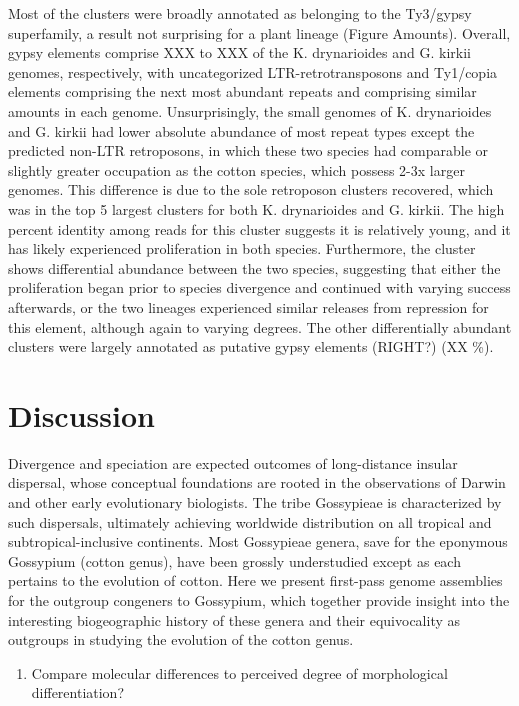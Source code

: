 \documentclass[10pt,letterpaper]{article}
\begin{document}
Most of the clusters were broadly annotated as belonging to the Ty3/gypsy
superfamily, a result not surprising for a plant lineage (Figure Amounts).
Overall, gypsy elements comprise XXX to XXX of the K. drynarioides and G. kirkii
genomes, respectively, with uncategorized LTR-retrotransposons and Ty1/copia
elements comprising the next most abundant repeats and comprising similar
amounts in each genome. Unsurprisingly, the small genomes of K. drynarioides and
G. kirkii had lower absolute abundance of most repeat types except the predicted
non-LTR retroposons, in which these two species had comparable or slightly
greater occupation as the cotton species, which possess 2-3x larger genomes.
This difference is due to the sole retroposon clusters recovered, which was in
the top 5 largest clusters for both K. drynarioides and G. kirkii. The high
percent identity among reads for this cluster suggests it is relatively young,
and it has likely experienced proliferation in both species. Furthermore, the
cluster shows differential abundance between the two species, suggesting that
either the proliferation began prior to species divergence and continued with
varying success afterwards, or the two lineages experienced similar releases
from repression for this element, although again to varying degrees. The other
differentially abundant clusters were largely annotated as putative gypsy
elements (RIGHT?) (XX \%).

\section*{Discussion}

Divergence and speciation are expected outcomes of long-distance insular
dispersal, whose conceptual foundations are rooted in the observations of Darwin
and other early evolutionary biologists. The tribe Gossypieae is characterized
by such dispersals, ultimately achieving worldwide distribution on all tropical
and subtropical-inclusive continents. Most Gossypieae genera, save for the
eponymous Gossypium (cotton genus), have been grossly understudied except as
each pertains to the evolution of cotton. Here we present first-pass genome
assemblies for the outgroup congeners to Gossypium, which together provide
insight into the interesting biogeographic history of these genera and their
equivocality as outgroups in studying the evolution of the cotton genus.

\begin{enumerate}
\item Compare molecular differences to perceived degree of morphological differentiation?
\end{enumerate}
\end{document}

